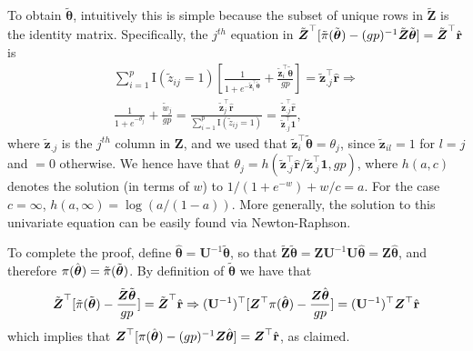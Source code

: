 \documentclass[
  12pt]{article}
\newcommand{\bz}{\boldsymbol{z}}
\newcommand{\btheta}{\boldsymbol{\theta}}
\newcommand{\bU}{\mathbf{U}}
\newcommand{\bZ}{\boldsymbol{Z}}
\begin{document}
To obtain $\tilde{\btheta}$, intuitively this is simple because the subset of unique rows in $\tilde{\bZ}$ is the identity matrix.
Specifically, the $j^{th}$ equation in $\tilde{\bZ}^{\top} [\tilde{{\bf \pi}}(\tilde{\btheta})  - (gp)^{-1} \tilde{\bZ} \tilde{\btheta} ]= \tilde{\bZ}^{\top} \hat{\mathbf{r}}$ is 
\begin{align}
 \sum_{i=1}^p  \mbox{I}(\tilde{z}_{ij}=1) \left[ \frac{1}{1 + e^{- \tilde{\bz}_i^{\top} \tilde{\btheta}}} + \frac{\tilde{\bz}_i^{\top} \tilde{\btheta}}{gp} \right]
= \tilde{\bz}_{.j}^{\top} \hat{\mathbf{r}}
\Rightarrow
\nonumber \\
 \frac{1}{1 + e^{- \theta_j}} + \frac{\tilde{w}_j}{gp} = \frac{\tilde{\bz}_j^{\top} \hat{\mathbf{r}}}{\sum_{i=1}^p \mbox{I}(\tilde{z}_{ij}=1)}
= \frac{\tilde{\bz}_{.j}^{\top} \hat{\mathbf{r}}}{\tilde{\bz}_{.j}^{\top} \mathbf{1}},
\nonumber
\end{align}
where $\tilde{\bz}_{.j}$ is the $j^{th}$ column in $\bZ$,
and we used that $\tilde{\bz}_i^{\top} \tilde{\btheta}= \theta_j$, since $\tilde{\bz}_{il}=1$ for $l=j$ and $=0$ otherwise.
We hence have that $\theta_j= h(\tilde{\bz}_{.j}^{\top} \hat{\mathbf{r}} / \tilde{\bz}_{.j}^{\top} \mathbf{1}, gp)$, 
where $h(a,c)$ denotes the solution (in terms of $w$) to $1/(1+e^{-w}) + w/c= a$.
For the case $c= \infty$, $h(a,\infty)= \log(a/(1-a))$.
More generally, the solution to this univariate equation can be easily found via Newton-Raphson.

To complete the proof, define $\hat{\btheta}= \bU^{-1} \tilde{\btheta}$,
so that $\tilde{\bZ} \tilde{\btheta}= \bZ \bU^{-1} \bU \hat{\btheta}= \bZ \hat{\btheta}$,
and therefore ${\bf \pi}(\hat{\btheta})= \tilde{{\bf \pi}}(\tilde{\btheta})$.
By definition of $\tilde{\btheta}$ we have that 
\begin{align}
\tilde{\bZ}^{\top} [ \tilde{{\bf \pi}}(\tilde{\btheta}) - \frac{\tilde{\bZ} \tilde{\btheta}}{gp}]= \tilde{\bZ}^{\top} \hat{\mathbf{r}}
\Rightarrow
(\bU^{-1})^{\top} [ \bZ^{\top} {\bf \pi}(\hat{\btheta})  - \frac{\bZ \hat{\btheta}}{gp} ]= (\bU^{-1})^{\top} \bZ^{\top} \hat{\mathbf{r}}
\nonumber
\end{align}
which implies that $\bZ^{\top} [{\bf \pi}(\hat{\btheta}) - (gp)^{-1} \bZ \hat{\btheta}] = \bZ^{\top} \hat{\mathbf{r}}$, as claimed.
\end{document}
